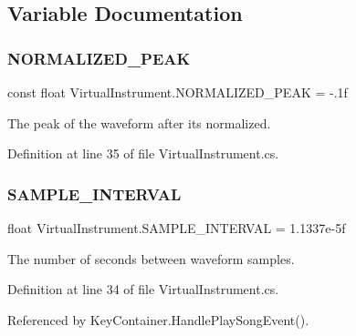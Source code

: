 \subsection{Variable Documentation}
\mbox{\label{group___v_i_base_const_gaf060c000443f92784bd8db8d866d8b2a}} 
\subsubsection{\texorpdfstring{N\+O\+R\+M\+A\+L\+I\+Z\+E\+D\+\_\+\+P\+E\+AK}{NORMALIZED\_PEAK}}
{\footnotesize\ttfamily const float Virtual\+Instrument.\+N\+O\+R\+M\+A\+L\+I\+Z\+E\+D\+\_\+\+P\+E\+AK = -\/.\+1f\hspace{0.3cm}{\ttfamily [private]}}



The peak of the waveform after it\textquotesingle{}s normalized. 



Definition at line 35 of file Virtual\+Instrument.\+cs.

\mbox{\label{group___v_i_base_const_ga69a037919b64e1e3e0f2b949b2b6af2c}} 
\subsubsection{\texorpdfstring{S\+A\+M\+P\+L\+E\+\_\+\+I\+N\+T\+E\+R\+V\+AL}{SAMPLE\_INTERVAL}}
{\footnotesize\ttfamily float Virtual\+Instrument.\+S\+A\+M\+P\+L\+E\+\_\+\+I\+N\+T\+E\+R\+V\+AL = 1.\+1337e-\/5f\hspace{0.3cm}{\ttfamily [static]}}



The number of seconds between waveform samples. 



Definition at line 34 of file Virtual\+Instrument.\+cs.



Referenced by Key\+Container.\+Handle\+Play\+Song\+Event().

